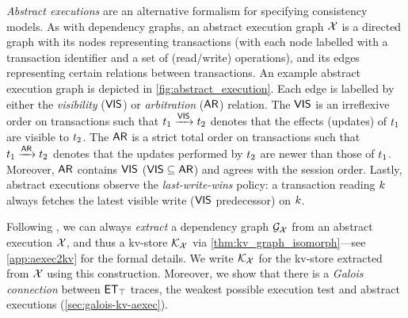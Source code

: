\emph{Abstract executions} \cite{ev_transactions,framework-concur} are an alternative formalism for specifying consistency models. 
As with dependency graphs, an abstract execution graph $\mathcal{X}$
is a directed graph with its nodes representing transactions (with each node labelled with a transaction identifier and a set of (read/write) operations), 
and its edges representing certain relations between transactions. 
An example abstract execution graph is depicted in \cref{fig:abstract_execution}. 
Each edge is labelled by either the \emph{visibility} ($\mathsf{VIS}$) or \emph{arbitration} ($\mathsf{AR}$) relation. 
The $\mathsf{VIS}$ is an irreflexive order on transactions such that $t_1 \xrightarrow{\mathsf{VIS}} t_2$ denotes that the effects (updates) of $t_1$ are visible to $t_2$. 
The $\mathsf{AR}$ is a strict total order on transactions such that $t_1 \xrightarrow{\mathsf{AR}} t_2$ denotes that the updates performed by $t_2$ are newer than those of $t_1$. 
Moreover, $\mathsf{AR}$ contains $\mathsf{VIS}$ ($\mathsf{VIS} \subseteq \mathsf{AR}$) and agrees with the session order.
Lastly, abstract executions observe the \emph{last-write-wins} policy: 
a transaction reading $k$ always fetches the latest visible write ($\mathsf{VIS}$ predecessor) on $k$.

Following \cite{laws}, we can always \emph{extract} a dependency graph $\mathcal{G}_{\mathcal{X}}$ from an abstract execution $\mathcal{X}$, and thus a kv-store $\mathcal{K}_{\mathcal{X}}$ via \cref{thm:kv_graph_isomorph}---see \cref{app:aexec2kv} for the formal details.
We write  $\mathcal{K}_{\mathcal{X}}$ for the kv-store extracted from $\mathcal{X}$ using this construction.  
Moreover, we show that there is a \emph{Galois connection}
between $\mathsf{ET}_{\top}$ traces, the weakest possible execution test and abstract executions (\cref{sec:galois-kv-aexec}).


